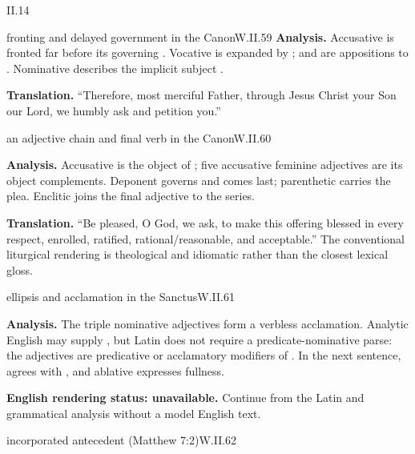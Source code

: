 \begin{courseunit}{II.14}
\begin{workedexample}{fronting and delayed government in the Canon}{W.II.59}
\textbf{Analysis.}  Accusative  is fronted far before its governing
.  Vocative  is expanded by ;
 and  are appositions to .  Nominative
 describes the implicit subject .

\textbf{Translation.}  ``Therefore, most merciful Father, through Jesus Christ your Son our
Lord, we humbly ask and petition you.''
\end{workedexample}

\begin{workedexample}{an adjective chain and final verb in the Canon}{W.II.60}

\textbf{Analysis.}  Accusative  is the object of ; five
accusative feminine adjectives are its object complements.  Deponent  governs
 and comes last; parenthetic  carries the plea.  Enclitic
 joins the final adjective to the series.

\textbf{Translation.} ``Be pleased, O God, we ask, to make this offering
blessed in every respect, enrolled, ratified, rational/reasonable, and
acceptable.'' The conventional liturgical rendering  is
theological and idiomatic rather than the closest lexical gloss.
\end{workedexample}

\begin{workedexample}{ellipsis and acclamation in the Sanctus}{W.II.61}

\textbf{Analysis.} The triple nominative adjectives form a verbless
acclamation. Analytic English may supply \Latin{[est]}, but Latin does not
require a predicate-nominative parse: the adjectives are predicative or
acclamatory modifiers of . In the next sentence,
 agrees with , and ablative
 expresses fullness.

\textbf{English rendering status: unavailable.} Continue from the Latin and
grammatical analysis without a model English text.
\end{workedexample}

\begin{workedexample}{incorporated antecedent (Matthew 7:2)}{W.II.62}


\end{workedexample}
\end{courseunit}

